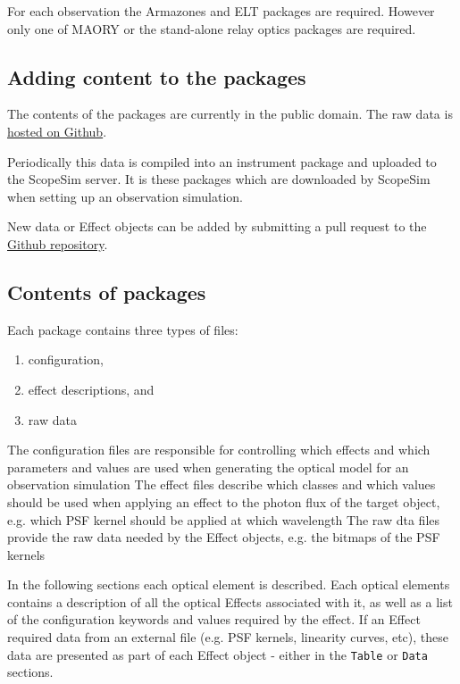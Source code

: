 For each observation the Armazones and ELT packages are required. However only one of MAORY or the stand-alone relay optics packages are required.


\subsection{Adding content to the packages%
  \label{adding-content-to-the-packages}%
}

The contents of the packages are currently in the public domain.
The raw data is \href{https://github.com/astronomyk/irdb}{hosted on Github}.

Periodically this data is compiled into an instrument package and uploaded to the ScopeSim server.
It is these packages which are downloaded by ScopeSim when setting up an observation simulation.

New data or Effect objects can be added by submitting a pull request to the \href{https://github.com/astronomyk/irdb}{Github repository}.


\subsection{Contents of packages%
  \label{contents-of-packages}%
}

Each package contains three types of files:

\begin{enumerate}
\item configuration,

\item effect descriptions, and

\item raw data
\end{enumerate}

The configuration files are responsible for controlling which effects and which parameters and values are used when generating the optical model for an observation simulation
The effect files describe which classes and which values should be used when applying an effect to the photon flux of the target object, e.g. which PSF kernel should be applied at which wavelength
The raw dta files provide the raw data needed by the Effect objects, e.g. the bitmaps of the PSF kernels

In the following sections each optical element is described.
Each optical elements contains a description of all the optical Effects associated with it, as well as a list of the configuration keywords and values required by the effect.
If an Effect required data from an external file (e.g. PSF kernels, linearity curves, etc), these data are presented as part of each Effect object - either in the \texttt{Table} or \texttt{Data} sections.

